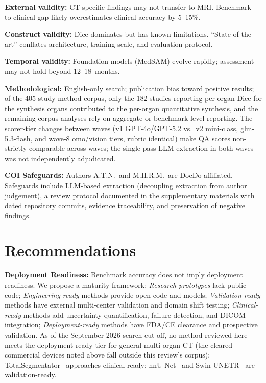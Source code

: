\textbf{External validity:} CT-specific findings may not transfer to MRI. Benchmark-to-clinical gap likely overestimates clinical accuracy by 5--15\%.

\textbf{Construct validity:} Dice dominates but has known limitations. ``State-of-the-art'' conflates architecture, training scale, and evaluation protocol.

\textbf{Temporal validity:} Foundation models (MedSAM) evolve rapidly; assessment may not hold beyond 12--18~months.

\textbf{Methodological:} English-only search; publication bias toward positive results; of the 405-study method corpus, only the 182 studies reporting per-organ Dice for the synthesis organs contributed to the per-organ quantitative synthesis, and the remaining corpus analyses rely on aggregate or benchmark-level reporting. The scorer-tier changes between waves (v1 GPT-4o/GPT-5.2 vs.\ v2 mini-class, glm-5.3-flash, and wave-8 omo/vision tiers, rubric identical) make QA scores non-strictly-comparable across waves; the single-pass LLM extraction in both waves was not independently adjudicated.

\textbf{COI Safeguards:} Authors A.T.N.\ and M.H.R.M.\ are DocDo-affiliated. Safeguards include LLM-based extraction (decoupling extraction from author judgement), a review protocol documented in the supplementary materials with dated repository commits, evidence traceability, and preservation of negative findings.

\section{Recommendations}
\label{sec:recommendations}

\textbf{Deployment Readiness:} Benchmark accuracy does not imply deployment readiness. We propose a maturity framework: \emph{Research prototypes} lack public code; \emph{Engineering-ready} methods provide open code and models; \emph{Validation-ready} methods have external multi-center validation and domain shift testing; \emph{Clinical-ready} methods add uncertainty quantification, failure detection, and DICOM integration; \emph{Deployment-ready} methods have FDA/CE clearance and prospective validation. As of the September 2026 search cut-off, no method reviewed here meets the deployment-ready tier for general multi-organ CT (the cleared commercial devices noted above fall outside this review's corpus); TotalSegmentator~\cite{wasserthal2023totalsegmentator} approaches clinical-ready; nnU-Net~\cite{isensee2021nnunet} and Swin UNETR~\cite{swinunetr2022} are validation-ready.

